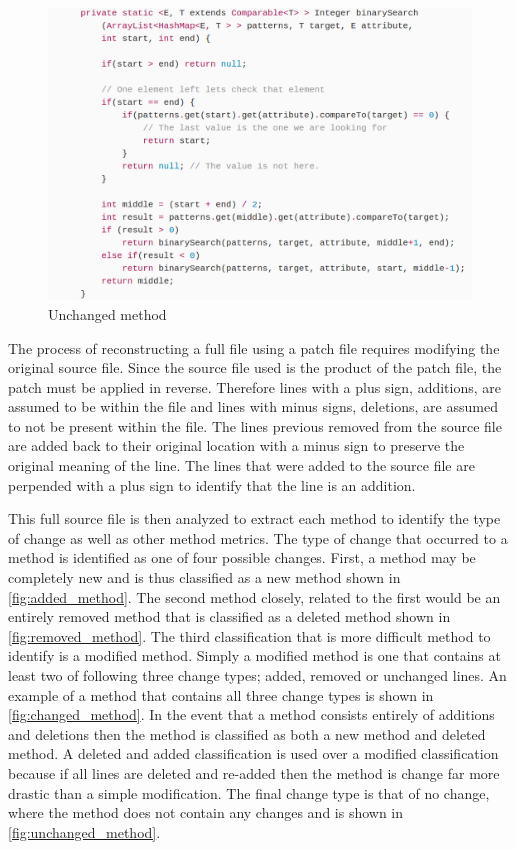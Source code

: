 \begin{figure}[!ht]
    \centering
        \includegraphics[width=1.0\textwidth]{images/unchanged_example}
    \caption{Unchanged method}
    \label{fig:unchanged_method}
\end{figure}

The process of reconstructing a full file using a patch file requires modifying the original source file. Since the source file used is the product of the patch file, the patch must be applied in reverse. Therefore lines with a plus sign, additions, are assumed to be within the file and lines with minus signs, deletions, are assumed to not be present within the file. The lines previous removed from the source file are added back to their original location with a minus sign to preserve the original meaning of the line. The lines that were added to the source file are perpended with a plus sign to identify that the line is an addition.

This full source file is then analyzed to extract each method to identify the type of change as well as other method metrics. The type of change that occurred to a method is identified as one of four possible changes. First, a method may be completely new and is thus classified as a new method shown in \autoref{fig:added_method}. The second method closely, related to the first would be an entirely removed method that is classified as a deleted method shown in \autoref{fig:removed_method}. The third classification that is more difficult method to identify is a modified method. Simply a modified method is one that contains at least two of following three change types; added, removed or unchanged lines. An example of a method that contains all three change types is shown in \autoref{fig:changed_method}. In the event that a method consists entirely of additions and deletions then the method is classified as both a new method and deleted method. A deleted and added classification is used over a modified classification because if all lines are deleted and re-added then the method is change far more drastic than a simple modification. The final change type is that of no change, where the method does not contain any changes and is shown in \autoref{fig:unchanged_method}.

